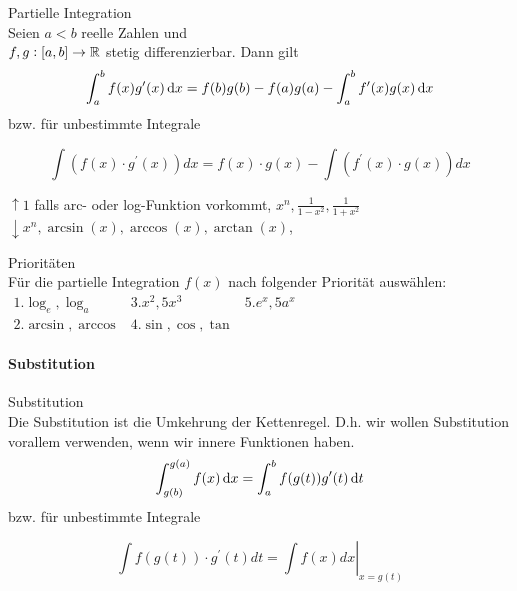\begin{concept}{Partielle Integration}\\
	Seien $a < b$ reelle Zahlen und\\$f,g:[a,b] \to \mathbb{R}$ stetig differenzierbar. Dann gilt
   \begin{equation*}
	   \int_a^b f(x) g'(x) \dif x = f(b) g(b) - f(a) g(a) - \int_a^b f'(x)g(x) \dif x
   \end{equation*}
   bzw. für unbestimmte Integrale

   $$
   \int\left(f(x) \cdot g^{\prime}(x)\right) d x=f(x) \cdot g(x)-\int\left(f^{\prime}(x) \cdot g(x)\right) d x
   $$
\end{concept}
\begin{remark}
   $\uparrow 1$ falls arc- oder log-Funktion vorkommt, $x^{n}, \frac{1}{1-x^{2}}, \frac{1}{1+x^{2}}$\\

   $\downarrow x^{n}, \arcsin (x), \arccos (x), \arctan (x)$,
\end{remark}
\begin{KR}{Prioritäten}\\
   Für die partielle Integration $f(x)$ nach folgender Priorität auswählen:\\
   $
   \begin{array}{lll}
	   1. \log_e, \log_a  &  3. x^2, 5x^3 & 5. e^x, 5a^x\\
	   2. \arcsin, \arccos & 4. \sin, \cos, \tan 
   \end{array}
   $
\end{KR}

\paragraph*{Substitution}

\begin{concept}{Substitution}\\
    Die Substitution ist die Umkehrung der Kettenregel. D.h. wir wollen Substitution vorallem verwenden, wenn wir innere Funktionen haben.
    \begin{equation*}
        \int_{g(b)}^{g(a)} f(x) \dif x = \int_{a}^b f(g(t)) g'(t) \dif t
    \end{equation*}
    bzw. für unbestimmte Integrale

    $$
    \int f(g(t)) \cdot g^{\prime}(t) d t=\left.\int f(x) d x\right|_{x=g(t)}
    $$
\end{concept}



